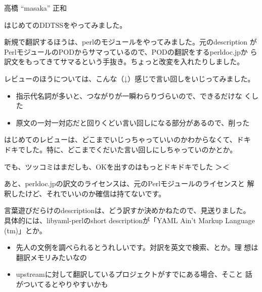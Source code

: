 \begin{prework}{高橋 ``masaka'' 正和}


 はじめてのDDTSSをやってみました。

 新規で翻訳するほうは、perlのモジュールをやってみました。元のdescription
 がPerlモジュールのPODからサマっているので、PODの翻訳をするperldoc.jpか
 ら訳文をもってきてサマるという手抜き。ちょっと改変を入れたりしました。

 レビューのほうについては、こんな（↓）感じで言い回しをいじってみました。

\begin{itemize}
 \item 指示代名詞が多いと、つながりが一瞬わらりづらいので、できるだけな
       くした
 \item 原文の一対一対応だと回りくどい言い回しになる部分があるので、削った
\end{itemize}


はじめてのレビューは、どこまでいじっちゃっていいのかわからなくて、ドキ
 ドキでした。特に、どこまでくだいた言い回しにしちゃっていのかとか。

 でも、ツッコミはまだしも、OKを出すのはもっとドキドキでした ＞＜

 あと、perldoc.jpの訳文のライセンスは、元のPerlモジュールのライセンスと
 解釈したけど、それでいいのか確信は持てないです。

 言葉遊びだらけのdescriptionは、どう訳すか決めかねたので、見送りました。
 具体的には、libyaml-perlのshort descriptionが「YAML Ain't Markup
 Language (tm)」とか。


\begin{itemize}
 \item 先人の文例を調べられるとうれしいです。対訳を英文で検索、とか。理
       想は翻訳メモリみたいなの
 \item upstreamに対して翻訳しているプロジェクトがすでにある場合、そこと
       話がついてるとやりやすいかも
\end{itemize}

\end{prework}

